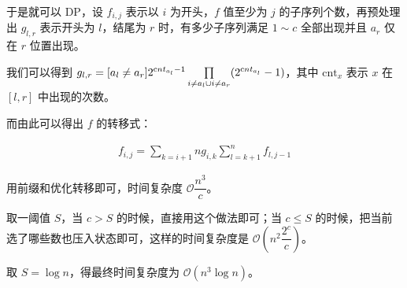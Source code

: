 \documentclass[UTF8,12pt,a4paper]{ctexart} %
\begin{document}
	于是就可以 $\text{DP}$，设 $f_{i,j}$ 表示以 $i$ 为开头，$f$ 值至少为 $j$ 的子序列个数，再预处理出 $g_{l,r}$ 表示开头为 $l$，结尾为 $r$ 时，有多少子序列满足 $1\sim c$ 全部出现并且 $a_r$ 仅在 $r$ 位置出现。
	
	我们可以得到 $g_{l,r}=[a_l\ne a_r]2^{{\text cnt}_{a_l}-1}\prod\limits_{i\ne a_l\cup i\ne a_r}(2^{{\text cnt}_{a_l}}-1)$，其中 $\text{cnt}_x$ 表示 $x$ 在 $[l,r]$ 中出现的次数。
	
	而由此可以得出 $f$ 的转移式：
	
	$$
	\begin{aligned}
		f_{i,j}=\sum\limits_{k=i+1}{n}g_{i,k}\sum\limits_{l=k+1}^{n}f_{l,j-1}
	\end{aligned}
	$$
	
	用前缀和优化转移即可，时间复杂度 $\mathcal{O}\dfrac{n^3}{c}$。
	
	取一阈值 $S$，当 $c>S$ 的时候，直接用这个做法即可；当 $c\le S$ 的时候，把当前选了哪些数也压入状态即可，这样的时间复杂度是 $\mathcal{O}(n^2\dfrac{2^c}{c})$。
	
	取 $S=\log n$，得最终时间复杂度为 $\mathcal{O}(n^3\log n)$。
	
\end{document}
